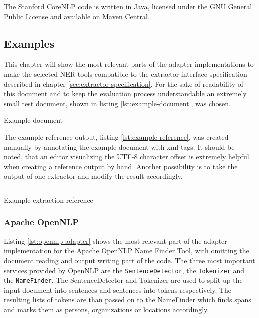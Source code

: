 The Stanford CoreNLP code is written in Java, licensed under the GNU General Public License and available on Maven Central.

\newpage
\subsection{Examples}
This chapter will show the most relevant parts of the adapter implementations to make the selected \gls{NER} tools compatible to the extractor interface specification described in chapter \ref{sec:extractor-specification}. For the sake of readability of this document and to keep the evaluation process understandable an extremely small test document, shown in listing \ref{lst:example-document}, was chosen.

\begin{listing}[H]
\texttt{}
\caption{Example document}
\label{lst:example-document}
\end{listing}

The example reference output, listing \ref{lst:example-reference}, was created manually by annotating the example document with xml tags. It should be noted, that an editor visualizing the UTF-8 character offset is extremely helpful when creating a reference output by hand. Another possibility is to take the output of one extractor and modify the result accordingly.

\begin{listing}[H]
\inputminted{xml}{reference.xml}
\caption{Example extraction reference}
\label{lst:example-reference}
\end{listing}

\newpage
\subsubsection{Apache OpenNLP}
Listing \ref{lst:opennlp-adapter} shows the most relevant part of the adapter implementation for the Apache OpenNLP Name Finder Tool, with omitting the document reading and output writing part of the code. The three most important services provided by OpenNLP are the \texttt{SentenceDetector}, the \texttt{Tokenizer} and the \texttt{NameFinder}. The SentenceDetector and Tokenizer are used to split up the input document into sentences and sentences into tokens respectively. The resulting lists of tokens are than passed on to the NameFinder which finds spans and marks them as persons, organizations or locations accordingly.

